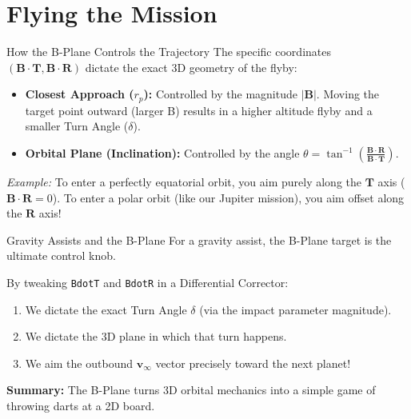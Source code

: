 \documentclass[11pt]{beamer}
\begin{document}
\section{Flying the Mission}

\begin{frame}{How the B-Plane Controls the Trajectory}
    The specific coordinates $(\bm{B \cdot T}, \bm{B \cdot R})$ dictate the exact 3D geometry of the flyby:
    
    \begin{itemize}
        \item \textbf{Closest Approach ($r_p$):} Controlled by the magnitude $|\bm{B}|$. Moving the target point outward (larger B) results in a higher altitude flyby and a smaller Turn Angle ($\delta$).
        \item \textbf{Orbital Plane (Inclination):} Controlled by the angle $\theta = \tan^{-1}\left(\frac{\bm{B \cdot R}}{\bm{B \cdot T}}\right)$. 
    \end{itemize}
    
    \vspace{0.3cm}
    \textit{Example:} To enter a perfectly equatorial orbit, you aim purely along the $\bm{T}$ axis ($\bm{B \cdot R} = 0$). To enter a polar orbit (like our Jupiter mission), you aim offset along the $\bm{R}$ axis!
\end{frame}

\begin{frame}{Gravity Assists and the B-Plane}
    For a gravity assist, the B-Plane target is the ultimate control knob. 
    
    \vspace{0.3cm}
    By tweaking \texttt{BdotT} and \texttt{BdotR} in a Differential Corrector:
    \begin{enumerate}
        \item We dictate the exact Turn Angle $\delta$ (via the impact parameter magnitude).
        \item We dictate the 3D plane in which that turn happens.
        \item We aim the outbound $\bm{v}_\infty$ vector precisely toward the next planet!
    \end{enumerate}
    
    \vspace{0.2cm}
    \textbf{Summary:} The B-Plane turns 3D orbital mechanics into a simple game of throwing darts at a 2D board.
\end{frame}
\end{document}
